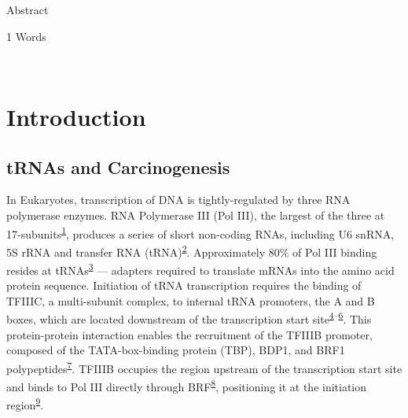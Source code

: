 \documentclass[
  12pt,
]{article}
\begin{document}
Abstract

\normalsize
\begin{flushright}
1 Words
\end{flushright}
\hrulefill\\
\setlength{\parindent}{10pt}

\hypertarget{introduction}{%
\section{Introduction}\label{introduction}}

\hypertarget{trnas-and-carcinogenesis}{%
\subsection{tRNAs and Carcinogenesis}\label{trnas-and-carcinogenesis}}

In Eukaryotes, transcription of DNA is tightly-regulated by three RNA polymerase enzymes.
RNA Polymerase III (Pol III), the largest of the three at 17-subunits\textsuperscript{\protect\hyperlink{ref-vannini2012}{1}}, produces a series of short non-coding RNAs, including U6 snRNA, 5S rRNA and transfer RNA (tRNA)\textsuperscript{\protect\hyperlink{ref-dieci2007}{2}}.
Approximately 80\% of Pol III binding resides at tRNAs\textsuperscript{\protect\hyperlink{ref-Raha2010a}{3}} --- adapters required to translate mRNAs into the amino acid protein sequence.
Initiation of tRNA transcription requires the binding of TFIIIC, a multi-subunit complex, to internal tRNA promoters, the A and B boxes, which are located downstream of the transcription start site\textsuperscript{\protect\hyperlink{ref-Schramm2002}{4}--\protect\hyperlink{ref-Galli1981}{6}}.
This protein-protein interaction enables the recruitment of the TFIIIB promoter, composed of the TATA-box-binding protein (TBP), BDP1, and BRF1 polypeptides\textsuperscript{\protect\hyperlink{ref-schramm2000}{7}}.
TFIIIB occupies the region upstream of the transcription start site and binds to Pol III directly through BRF\textsuperscript{\protect\hyperlink{ref-Khoo1994}{8}}, positioning it at the initiation region\textsuperscript{\protect\hyperlink{ref-kassavetis1990}{9}}.
\end{document}
